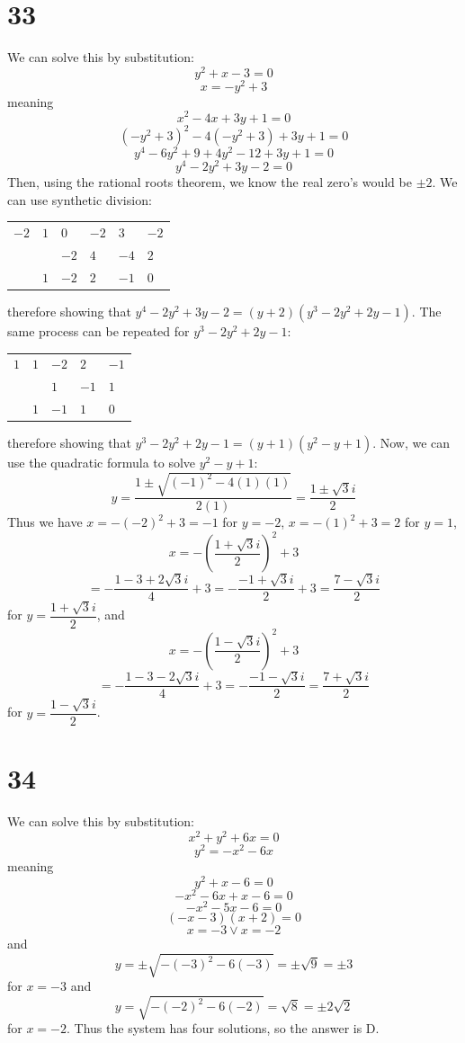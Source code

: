 \documentclass{article}
\theoremstyle{definition}
\newcommand{\?}{\stackrel{?}{=}}
\begin{document}
\section*{33}
We can solve this by substitution:
\[ y^2+x-3=0 \] \[ x=-y^2+3 \] meaning
\[ x^2-4x+3y+1=0 \] \[ (-y^2+3)^2-4(-y^2+3)+3y+1=0 \]
\[ y^4-6y^2+9+4y^2-12+3y+1=0 \]
\[ y^4-2y^2+3y-2=0 \]
Then, using the rational roots theorem, we know the real zero's would be $\pm 2$. We can use synthetic division:
\begin{center}
\begin{tabular}{l|l|l|l|l|l}
$-2$ & $1$ & $0$ & $-2$ & $3$ & $-2$ \\
& & $-2$ & $4$ & $-4$ & $2$ \\
& $1$ & $-2$ & $2$ & $-1$ & $0$
\end{tabular}
\end{center}
therefore showing that $y^4-2y^2+3y-2=(y+2)(y^3-2y^2+2y-1)$. The same process can be repeated for $y^3-2y^2+2y-1$:
\begin{center}
\begin{tabular}{l|l|l|l|l}
$1$ & $1$ & $-2$ & $2$ & $-1$ \\
& & $1$ & $-1$ & $1$ \\
& $1$ & $-1$ & $1$ & $0$
\end{tabular}
\end{center}
therefore showing that $y^3-2y^2+2y-1=(y+1)(y^2-y+1)$. Now, we can use the quadratic formula to solve $y^2-y+1$:
\[ y=\dfrac{1\pm\sqrt{(-1)^2-4(1)(1)}}{2(1)}=\dfrac{1\pm\sqrt{3}i}{2} \]
Thus we have $x=-(-2)^2+3=-1$ for $y=-2$, $x=-(1)^2+3=2$ for $y=1$, 
\[ x=-(\dfrac{1+\sqrt{3}i}{2})^2+3 \] 
\[ =-\dfrac{1-3+2\sqrt{3}i}{4}+3=-\frac{-1+\sqrt{3}i}{2}+3=\frac{7-\sqrt{3}i}{2} \]
for $y=\dfrac{1+\sqrt{3}i}{2}$, and 
\[ x=-(\dfrac{1-\sqrt{3}i}{2})^2+3 \]
\[ =-\frac{1-3-2\sqrt{3}i}{4}+3=-\frac{-1-\sqrt{3}i}{2}=\frac{7+\sqrt{3}i}{2} \]
 for $y=\dfrac{1-\sqrt{3}i}{2}$.

\section*{34}
We can solve this by substitution:
\[ x^2+y^2+6x=0 \] \[ y^2=-x^2-6x \] meaning
\[ y^2+x-6=0 \] \[ -x^2-6x+x-6=0 \]
\[ -x^2-5x-6=0 \]
\[ (-x-3)(x+2)=0 \] \[ x=-3\vee x=-2 \] and 
\[ y=\pm\sqrt{-(-3)^2-6(-3)}=\pm\sqrt{9}=\pm 3 \] for $x=-3$ and 
\[ y=\sqrt{-(-2)^2-6(-2)}=\sqrt{8}=\pm 2\sqrt{2} \] for $x=-2$. Thus the system has four solutions, so the answer is D.
\end{document}
